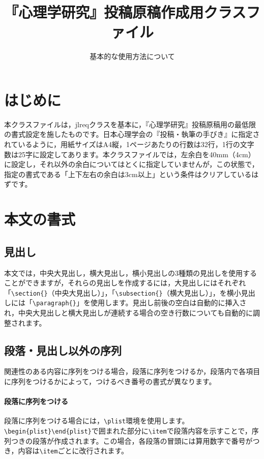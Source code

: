 \documentclass{jjpsy}
\title{『心理学研究』投稿原稿作成用クラスファイル}{Class file for preparing a manuscript for submission to Journal of Psychological Research}
\subtitle{基本的な使用方法について}{Basic instructions}
\begin{document}
\pagewiselinenumbers %
\maketitle
\section{はじめに}

本クラスファイルは，jlreqクラスを基本に，『心理学研究』投稿原稿用の最低限の書式設定を施したものです。日本心理学会の『投稿・執筆の手びき』\parencite{}に指定されているように，用紙サイズはA4縦，1ページあたりの行数は32行，1行の文字数は25字に設定してあります。本クラスファイルでは，左余白を40mm（4cm）に設定し，それ以外の余白についてはとくに指定していませんが，この状態で，指定の書式である「上下左右の余白は3cm以上」という条件はクリアしているはずです。

\section{本文の書式}
\subsection{見出し}
本文では，中央大見出し，横大見出し，横小見出しの3種類の見出しを使用することができますが，それらの見出しを作成するには，大見出しにはそれぞれ「\texttt{\textbackslash{}section\{\}}（中央大見出し）」，「\texttt{\textbackslash{}subsection\{\}}（横大見出し）」，を横小見出しには「\texttt{\textbackslash{}paragraph\{\}}」を使用します。見出し前後の空白は自動的に挿入され，中央大見出しと横大見出しが連続する場合の空き行数についても自動的に調整されます。

\subsection{段落・見出し以外の序列}

関連性のある内容に序列をつける場合，段落に序列をつけるか，段落内で各項目に序列をつけるかによって，つけるべき番号の書式が異なります。

\paragraph{段落に序列をつける}
段落に序列をつける場合には，\texttt{\textbackslash{}plist}環境を使用します。\texttt{\textbackslash{}begin\{plist\}}\dash\texttt{\textbackslash{}end\{plist\}}で囲まれた部分に\texttt{\textbackslash{}item}で段落内容を示すことで，序列つきの段落が作成されます。この場合，各段落の冒頭には算用数字で番号がつき，内容は\texttt{\textbackslash{}item}ごとに改行されます。
\end{document}
